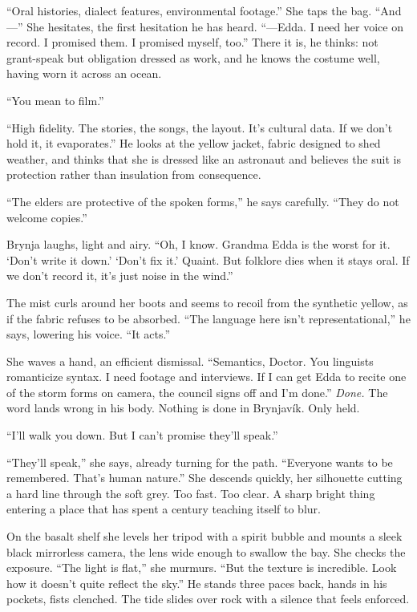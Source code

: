 \documentclass[11pt,oneside]{book}
\newcommand{\sceneline}{%
  \par\vspace{1.2em}
  \begin{center}
    \fontsize{11}{11}\selectfont \textbullet\quad\textbullet\quad\textbullet
  \end{center}
  \vspace{0.6em}\noindent\ignorespaces
}
\begin{document}
``Oral histories, dialect features, environmental footage.'' She taps
the bag. ``And---'' She hesitates, the first hesitation he has heard.
``---Edda. I need her voice on record. I promised them. I promised
myself, too.'' There it is, he thinks: not grant-speak but obligation
dressed as work, and he knows the costume well, having worn it across an
ocean.

``You mean to film.''

``High fidelity. The stories, the songs, the layout. It's cultural data.
If we don't hold it, it evaporates.'' He looks at the yellow jacket,
fabric designed to shed weather, and thinks that she is dressed like an
astronaut and believes the suit is protection rather than insulation
from consequence.

``The elders are protective of the spoken forms,'' he says carefully.
``They do not welcome copies.''

Brynja laughs, light and airy. ``Oh, I know. Grandma Edda is the worst
for it. `Don't write it down.' `Don't fix it.' Quaint. But folklore dies
when it stays oral. If we don't record it, it's just noise in the
wind.''

The mist curls around her boots and seems to recoil from the synthetic
yellow, as if the fabric refuses to be absorbed. ``The language here
isn't representational,'' he says, lowering his voice. ``It acts.''

She waves a hand, an efficient dismissal. ``Semantics, Doctor. You
linguists romanticize syntax. I need footage and interviews. If I can
get Edda to recite one of the storm forms on camera, the council signs
off and I'm done.'' \emph{Done.} The word lands wrong in his body.
Nothing is done in Brynjavík. Only held.

``I'll walk you down. But I can't promise they'll speak.''

``They'll speak,'' she says, already turning for the path. ``Everyone
wants to be remembered. That's human nature.'' She descends quickly, her
silhouette cutting a hard line through the soft grey. Too fast. Too
clear. A sharp bright thing entering a place that has spent a century
teaching itself to blur.

\sceneline

On the basalt shelf she levels her tripod with a spirit bubble and
mounts a sleek black mirrorless camera, the lens wide enough to swallow
the bay. She checks the exposure. ``The light is flat,'' she murmurs.
``But the texture is incredible. Look how it doesn't quite reflect the
sky.'' He stands three paces back, hands in his pockets, fists clenched.
The tide slides over rock with a silence that feels enforced.
\end{document}
